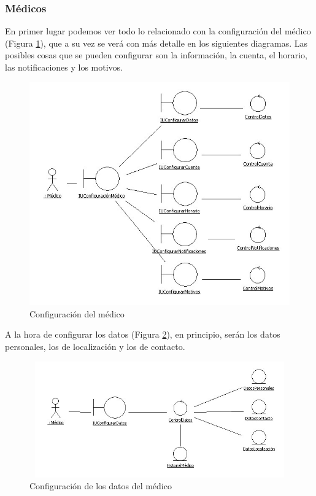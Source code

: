 
\newpage
\subsubsection{Médicos} %
\label{ssub:medicos}

	En primer lugar podemos ver todo lo relacionado con la configuración del médico (Figura \ref{fig:col_clase1}), que a su vez se verá con más detalle en los siguientes diagramas. Las posibles cosas que se pueden configurar son la información, la cuenta, el horario, las notificaciones y los motivos.
	\begin{figure}[H]
	  \centering
	    \includegraphics[width=16cm]{img/jpg/clases/1_MedicoConfiguracion.jpg}
	  \caption{Configuración del médico}
	  \label{fig:col_clase1}
	\end{figure}
	
	\newpage
	A la hora de configurar los datos (Figura \ref{fig:col_clase2}), en principio, serán los datos personales, los de localización y los de contacto.
	\begin{figure}[H]
	  \centering
	    \includegraphics[width=12cm, height=5cm]{img/jpg/clases/2_MedicosConfiguracionDatos.jpg}
	  \caption{Configuración de los datos del médico}
	  \label{fig:col_clase2}
	\end{figure}

